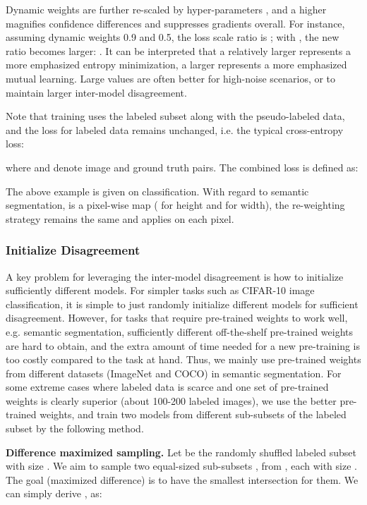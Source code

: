 \documentclass[preprint,review,10pt]{elsarticle}
\begin{document}
Dynamic weights are further re-scaled by hyper-parameters , and a higher  magnifies confidence differences and suppresses gradients overall. For instance, assuming dynamic weights 0.9 and 0.5, the loss scale ratio is ; with , the new ratio becomes larger: . It can be interpreted that a relatively larger  represents a more emphasized entropy minimization, a larger  represents a more emphasized mutual learning. Large  values are often better for high-noise scenarios, or to maintain larger inter-model disagreement.

Note that training uses the labeled subset along with the pseudo-labeled data, and the loss for labeled data  remains unchanged, i.e. the typical cross-entropy loss:

where  and  denote image and ground truth pairs. The combined loss  is defined as:


The above example is given on classification. With regard to semantic segmentation,  is a pixel-wise map ( for height and  for width), the re-weighting strategy remains the same and applies on each pixel.



\subsubsection{Initialize Disagreement}
\label{sec:412}

A key problem for leveraging the inter-model disagreement is how to initialize sufficiently different models. For simpler tasks such as CIFAR-10 image classification, it is simple to just randomly initialize different models for sufficient disagreement. However, for tasks that require pre-trained weights to work well, e.g. semantic segmentation, sufficiently different off-the-shelf pre-trained weights are hard to obtain, and the extra amount of time needed for a new pre-training is too costly compared to the task at hand. Thus, we mainly use pre-trained weights from different datasets (ImageNet and COCO) in semantic segmentation. For some extreme cases where labeled data is scarce and one set of pre-trained weights is clearly superior (about 100-200 labeled images), we use the better pre-trained weights, and train two models from different sub-subsets of the labeled subset by the following method.

\noindent \textbf{Difference maximized sampling.} Let  be the randomly shuffled labeled subset with size . We aim to sample two equal-sized sub-subsets ,  from , each with size . The goal (maximized difference) is to have the smallest intersection for them. We can simply derive ,  as:
\end{document}
